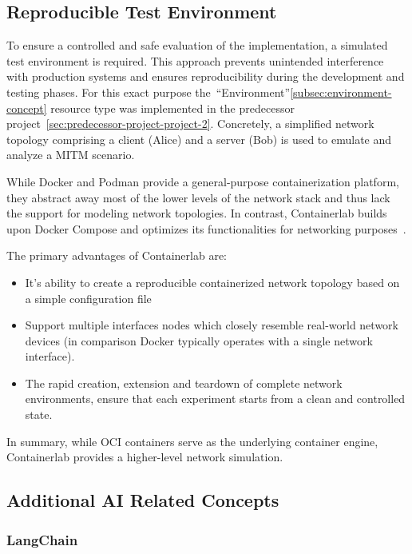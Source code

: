 \subsection{Reproducible Test Environment}\label{subsec:reproducible-test-environment-concept}

To ensure a controlled and safe evaluation of the implementation, a simulated test environment is required.
This approach prevents unintended interference with production systems and ensures reproducibility during the development and testing phases.
For this exact purpose the~\enquote{Environment}\ref{subsec:environment-concept} resource type was implemented in the predecessor project~\ref{sec:predecessor-project-project-2}.
Concretely, a simplified network topology comprising a client (Alice) and a server (Bob) is used to emulate and analyze a \gls{MITM} scenario.

While \gls{Docker} and \gls{Podman} provide a general-purpose containerization platform,
they abstract away most of the lower levels of the network stack and thus lack the support for modeling network topologies.
In contrast, \gls{Containerlab} builds upon \gls{Docker Compose} and optimizes its functionalities for networking purposes~\cite{containerlab}.

The primary advantages of \gls{Containerlab} are:
\begin{itemize}
    \item It's ability to create a reproducible containerized network topology based on a simple configuration file
    \item Support multiple interfaces nodes which closely resemble real-world network devices (in comparison \gls{Docker} typically operates with a single network interface).
    \item The rapid creation, extension and teardown of complete network environments, ensure that each experiment starts from a clean and controlled state.
\end{itemize}
In summary, while OCI containers serve as the underlying container engine, \gls{Containerlab} provides a higher-level network simulation.

\subsection{Additional \gls{AI} Related Concepts}\label{subsec:additional-ai-related-concepts}

\subsubsection{LangChain}\label{subsubsec:langchain-concept}

